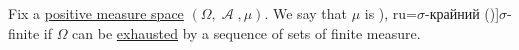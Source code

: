 \begin{definition}\label{def:sigma_finite_measure}
  Fix a \hyperref[def:measure/positive]{positive measure space} \( (\Omega, \mscrA, \mu) \). We say that \( \mu \) is \term[bg=\( \sigma \)-крайна мярка (\cite[def. 3.11]{Драганов2022ТеорияНаМярката}), ru=\( \sigma \)-крайний (\cite[def. 1.6.1]{Богачёв2003ОсновыТеорииМерыТом1})]{\( \sigma \)-finite} if \( \Omega \) can be \hyperref[def:exhausting_sequence]{exhausted} by a sequence of sets of finite measure.
\end{definition}
